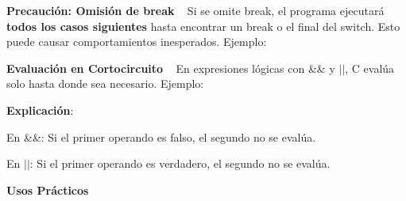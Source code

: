 

{\bfseries{Precaución\+: Omisión de {\ttfamily break}}} ~\newline
 Si se omite {\ttfamily break}, el programa ejecutará {\bfseries{todos los casos siguientes}} hasta encontrar un {\ttfamily break} o el final del {\ttfamily switch}. Esto puede causar comportamientos inesperados. Ejemplo\+: 
\begin{DoxyCode}{0}
\DoxyCodeLine{        \textcolor{comment}{// Sin break: ¡Ejecutará el siguiente caso!}}
\DoxyCodeLine{        \textcolor{keywordflow}{break};}
\DoxyCodeLine{\}}

\end{DoxyCode}




{\bfseries{Evaluación en Cortocircuito}} ~\newline
 En expresiones lógicas con {\ttfamily \&\&} y {\ttfamily $\vert$$\vert$}, C evalúa solo hasta donde sea necesario. Ejemplo\+: 
\begin{DoxyCode}{0}
\DoxyCodeLine{    \textcolor{comment}{// Si a es 0, evita la división (evita error)}}
\DoxyCodeLine{\}}

\end{DoxyCode}
 {\bfseries{Explicación}}\+: ~\newline

\begin{DoxyItemize}
\item En {\ttfamily \&\&}\+: Si el primer operando es falso, el segundo no se evalúa. ~\newline

\item En {\ttfamily $\vert$$\vert$}\+: Si el primer operando es verdadero, el segundo no se evalúa. ~\newline

\end{DoxyItemize}



{\bfseries{Usos Prácticos}} ~\newline

